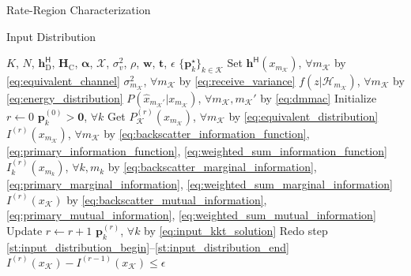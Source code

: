 \documentclass[journal]{IEEEtran}
\begin{document}
\begin{section}{Rate-Region Characterization}
\begin{subsection}{Input Distribution}
		\begin{algorithm}[!t]
			\caption{Numerical \gls{kkt} Input Distribution Evaluation by Limits of Sequence}
			\label{al:input_distribution}
			\begin{algorithmic}[1]
				\Require $K$, $N$, $\boldsymbol{h}_{\text{D}}^\mathsf{H}$, $\boldsymbol{H}_{\text{C}}$, $\boldsymbol{\alpha}$, $\mathcal{X}$, $\sigma_v^2$, $\rho$, $\boldsymbol{w}$, $\boldsymbol{t}$, $\epsilon$
				\Ensure $\{\boldsymbol{p}_k^\star\}_{k \in \mathcal{K}}$
				\State Set $\boldsymbol{h}^\mathsf{H}(x_{m_{\mathcal{K}}})$, $\forall m_{\mathcal{K}}$ by \eqref{eq:equivalent_channel}
				\State \phantom{Set} $\sigma^2_{m_{\mathcal{K}}}$, $\forall m_{\mathcal{K}}$ by \eqref{eq:receive_variance}
				\State \phantom{Set} $f(z|\mathcal{H}_{m_{\mathcal{K}}})$, $\forall m_{\mathcal{K}}$ by \eqref{eq:energy_distribution}
				\State \phantom{Set} $P(\hat{x}_{m_{\mathcal{K}}'}|x_{m_{\mathcal{K}}})$, $\forall m_{\mathcal{K}}, m_{\mathcal{K}}'$ by \eqref{eq:dmmac}
				\State Initialize $r \gets 0$
				\State \phantom{Initialize} $\boldsymbol{p}_k^{(0)} > \boldsymbol{0}$, $\forall k$
				\State Get $P_{\mathcal{K}}^{(r)}(x_{m_{\mathcal{K}}})$, $\forall m_{\mathcal{K}}$ by \eqref{eq:equivalent_distribution} \label{st:input_distribution_begin}
				\State \phantom{Get} $I^{(r)}(x_{m_{\mathcal{K}}})$, $\forall m_{\mathcal{K}}$ by \eqref{eq:backscatter_information_function}, \eqref{eq:primary_information_function}, \eqref{eq:weighted_sum_information_function}
				\State \phantom{Get} $I^{(r)}_k(x_{m_k})$, $\forall k,m_k$ by \eqref{eq:backscatter_marginal_information}, \eqref{eq:primary_marginal_information}, \eqref{eq:weighted_sum_marginal_information}
				\State \phantom{Get} $I^{(r)}(x_{\mathcal{K}})$ by \eqref{eq:backscatter_mutual_information}, \eqref{eq:primary_mutual_information}, \eqref{eq:weighted_sum_mutual_information} \label{st:input_distribution_end}
				\Repeat
					\State Update $r \gets r+1$
					\State \phantom{Update} $\boldsymbol{p}_k^{(r)}$, $\forall k$ by \eqref{eq:input_kkt_solution}
					\State Redo step \ref{st:input_distribution_begin}--\ref{st:input_distribution_end}
				\Until $I^{(r)}(x_{\mathcal{K}}) - I^{(r-1)}(x_{\mathcal{K}}) \le \epsilon$
			\end{algorithmic}
		\end{algorithm}
	\end{subsection}


\end{section}
\end{document}
